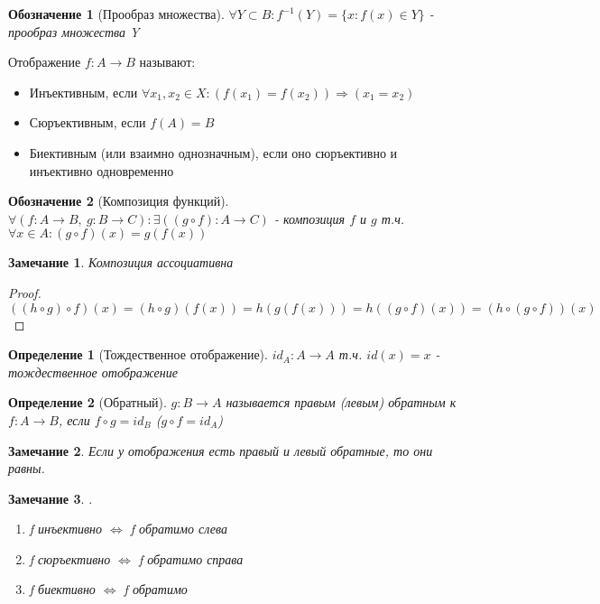 \documentclass[11pt,a4paper,titlepage]{article}
\newtheorem*{definition}{Определение}
\newtheorem*{notation}{Обозначение}
\newtheorem*{remark}{Замечание}
\renewcommand{\implies}{\Rightarrow}
\renewcommand{\iff}{\Leftrightarrow}
\begin{document}
    \begin{notation}[Прообраз множества]
        $\forall Y \subset B: f^{-1}(Y) = \{x : f(x) \in Y\}$ - прообраз множества Y
    \end{notation}

    Отображение $f: A \to B$ называют:
    \begin{itemize}
        \item Инъективным, если $\forall x_1, x_2 \in X: (f(x_1) = f(x_2)) \implies (x_1 = x_2)$
        \item Сюръективным, если $f(A) = B$
        \item Биективным (или взаимно однозначным), если оно сюръективно и инъективно одновременно
    \end{itemize}

    \begin{notation}[Композиция функций]
        $\forall (f:A \to B, \  g: B \to C): \exists ((g \circ f) : A \to C )$ - композиция $f$ и $g$ т.ч. $\forall x \in A: (g \circ f)(x) = g(f(x))$
    \end{notation}

    \begin{remark}
        Композиция ассоциативна
    \end{remark}

    \begin{proof}
        $((h \circ g) \circ f)(x) = (h \circ g)(f(x)) = h(g(f(x))) = h((g \circ f)(x)) = (h \circ (g \circ f))(x)$
    \end{proof}

    \begin{definition}[Тождественное отображение]
        $id_A: A \to A$ т.ч. $id(x)=x$ - тождественное отображение
    \end{definition}

    \begin{definition}[Обратный]
        $g: B \to A$ называется правым (левым) обратным к $f: A \to B$, если $f \circ g = id_B$ ($g \circ f = id_A$)
    \end{definition}

    \begin{remark}
        Если у отображения есть правый и левый обратные, то они равны.
    \end{remark}

    \begin{remark}
        .
        \begin{enumerate}
            \item f инъективно $\iff$ f обратимо слева
            \item f сюръективно $\iff$ f обратимо справа
            \item f биективно $\iff$ f обратимо
        \end{enumerate}
    \end{remark}
\end{document}

